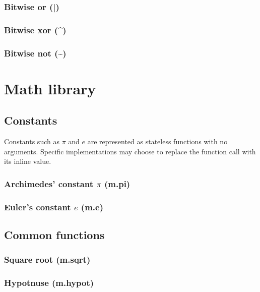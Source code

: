 \documentclass{article}
\theoremstyle{definition}
\begin{document}
\subsubsection{Bitwise or (|)}

\subsubsection{Bitwise xor (\^{})}

\subsubsection{Bitwise not (\textasciitilde{})}

\pagebreak

\section{Math library}

\subsection{Constants}

Constants such as $\pi$ and $e$ are represented as stateless functions with no arguments.  Specific implementations may choose to replace the function call with its inline value.

\subsubsection{Archimedes' constant $\pi$ (m.pi)}

\subsubsection{Euler's constant $e$ (m.e)}

\subsection{Common functions}

\subsubsection{Square root (m.sqrt)}

\subsubsection{Hypotnuse (m.hypot)}
\end{document}
